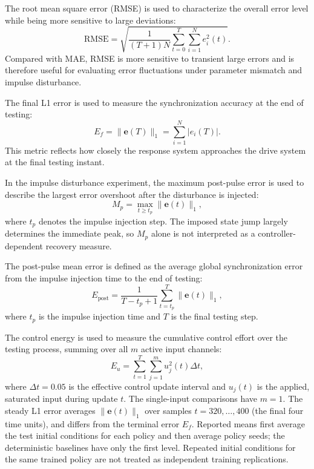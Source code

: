 \documentclass[a4paper,fleqn]{cas-sc}
\theoremstyle{plain}
\theoremstyle{definition}
\begin{document}
The root mean square error (RMSE) is used to characterize the overall error level while being more sensitive to large deviations:
\begin{equation}
	\mathrm{RMSE}
	=
	\sqrt{
		\frac{1}{(T+1)N}
		\sum_{t=0}^{T}
		\sum_{i=1}^{N}
		e_i^2(t)
	}.
	\label{eq:rmse}
\end{equation}
Compared with MAE, RMSE is more sensitive to transient large errors and is therefore useful for evaluating error fluctuations under parameter mismatch and impulse disturbance.

The final L1 error is used to measure the synchronization accuracy at the end of testing:
\begin{equation}
	E_f=\|\mathbf{e}(T)\|_1
	=
	\sum_{i=1}^{N}|e_i(T)|.
	\label{eq:final_l1_error}
\end{equation}
This metric reflects how closely the response system approaches the drive system at the final testing instant.

In the impulse disturbance experiment, the maximum post-pulse error is used to describe the largest error overshoot after the disturbance is injected:
\begin{equation}
	M_p=\max_{t\geq t_p}\|\mathbf{e}(t)\|_1,
	\label{eq:max_post_pulse_error}
\end{equation}
where $t_p$ denotes the impulse injection step. The imposed state jump largely determines the immediate peak, so $M_p$ alone is not interpreted as a controller-dependent recovery measure.

The post-pulse mean error is defined as the average global synchronization error from the impulse injection time to the end of testing:
\begin{equation}
	E_{\mathrm{post}}
	=
	\frac{1}{T-t_p+1}
	\sum_{t=t_p}^{T}
	\|\mathbf{e}(t)\|_1,
	\label{eq:post_pulse_mean_error}
\end{equation}
where $t_p$ is the impulse injection time and $T$ is the final testing step.

The control energy is used to measure the cumulative control effort over the testing process, summing over all $m$ active input channels:
\begin{equation}
	E_u=
	\sum_{t=1}^{T}
	\sum_{j=1}^{m}u_j^2(t)\Delta t,
	\label{eq:control_energy}
\end{equation}
where $\Delta t=0.05$ is the effective control update interval and $u_j(t)$ is the applied, saturated input during update $t$. The single-input comparisons have $m=1$. The steady L1 error averages $\|\mathbf e(t)\|_1$ over samples $t=320,\ldots,400$ (the final four time units), and differs from the terminal error $E_f$. Reported means first average the test initial conditions for each policy and then average policy seeds; the deterministic baselines have only the first level. Repeated initial conditions for the same trained policy are not treated as independent training replications.
\end{document}
